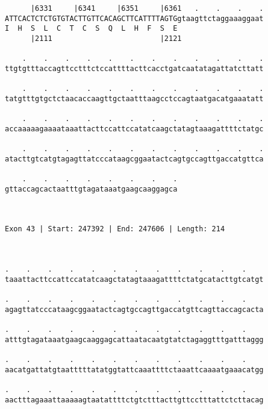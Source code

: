 \documentclass{article}
\begin{document}
\begin{Verbatim}
      |6331     |6341     |6351     |6361   .    .    .    .
ATTCACTCTCTGTGTACTTGTTCACAGCTTCATTTTAGTGgtaagttctaggaaaggaat
I  H  S  L  C  T  C  S  Q  L  H  F  S  E                    
      |2111                         |2121                   
  
    .    .    .    .    .    .    .    .    .    .    .    .
ttgtgtttaccagttcctttctccattttacttcacctgatcaatatagattatcttatt
                                                            
    .    .    .    .    .    .    .    .    .    .    .    .
tatgtttgtgctctaacaccaagttgctaatttaagcctccagtaatgacatgaaatatt
                                                            
    .    .    .    .    .    .    .    .    .    .    .    .
accaaaaagaaaataaattacttccattccatatcaagctatagtaaagattttctatgc
                                                            
    .    .    .    .    .    .    .    .    .    .    .    .
atacttgtcatgtagagttatcccataagcggaatactcagtgccagttgaccatgttca
                                                            
    .    .    .    .    .    .    .    .
gttaccagcactaatttgtagataaatgaagcaaggagca
                                        
                                        
 
Exon 43 | Start: 247392 | End: 247606 | Length: 214



.    .    .    .    .    .    .    .    .    .    .    .    
taaattacttccattccatatcaagctatagtaaagattttctatgcatacttgtcatgt
                                                            
.    .    .    .    .    .    .    .    .    .    .    .    
agagttatcccataagcggaatactcagtgccagttgaccatgttcagttaccagcacta
                                                            
.    .    .    .    .    .    .    .    .    .    .    .    
atttgtagataaatgaagcaaggagcattaatacaatgtatctagaggtttgatttaggg
                                                            
.    .    .    .    .    .    .    .    .    .    .    .    
aacatgattatgtaatttttatatggtattcaaattttctaaattcaaaatgaaacatgg
                                                            
.    .    .    .    .    .    .    .    .    .    .    .    
aactttagaaattaaaaagtaatattttctgtctttacttgttcctttattctcttacag
                                                            

\end{Verbatim}
\end{document}
